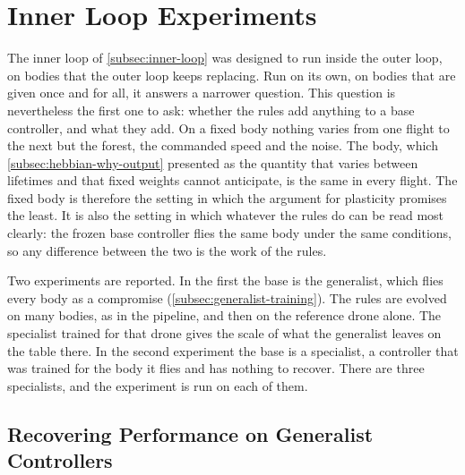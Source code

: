 \section{Inner Loop Experiments}
\label{sec:inner-loop-experiments}

The inner loop of \autoref{subsec:inner-loop} was designed to run inside the outer loop, on bodies that the outer loop keeps replacing. Run on its own, on bodies that are given once and for all, it answers a narrower question. This question is nevertheless the first one to ask: whether the rules add anything to a base controller, and what they add. On a fixed body nothing varies from one flight to the next but the forest, the commanded speed and the noise. The body, which \autoref{subsec:hebbian-why-output} presented as the quantity that varies between lifetimes and that fixed weights cannot anticipate, is the same in every flight. The fixed body is therefore the setting in which the argument for plasticity promises the least. It is also the setting in which whatever the rules do can be read most clearly: the frozen base controller flies the same body under the same conditions, so any difference between the two is the work of the rules.

Two experiments are reported. In the first the base is the generalist, which flies every body as a compromise (\autoref{subsec:generalist-training}). The rules are evolved on many bodies, as in the pipeline, and then on the reference drone alone. The specialist trained for that drone gives the scale of what the generalist leaves on the table there. In the second experiment the base is a specialist, a controller that was trained for the body it flies and has nothing to recover. There are three specialists, and the experiment is run on each of them.

\subsection{Recovering Performance on Generalist Controllers}
\label{subsec:results-generalist}

